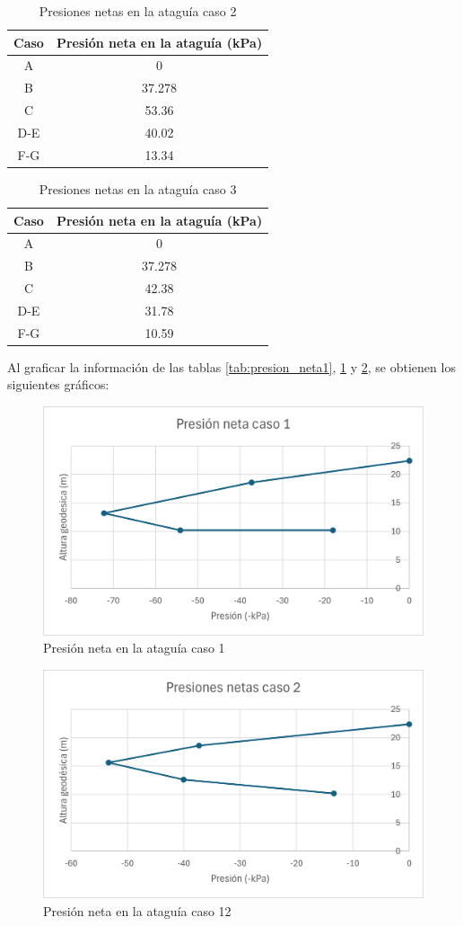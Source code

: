 \documentclass{article}
\begin{document}
\begin{table}[h!]
  \centering
  \begin{tabular}{cc}
    \hline
    \textbf{Caso} & \textbf{Presión neta en la ataguía (kPa)} \\
    \hline
    A & 0 \\
    B & 37.278 \\
    C & 53.36 \\
    D-E & 40.02\\
    F-G & 13.34 \\
    \hline  
  \end{tabular}
  \caption{Presiones netas en la ataguía caso 2}
  \label{tab:presion_neta2}
\end{table}

\begin{table}[h!]
  \centering
  \begin{tabular}{cc}
    \hline
    \textbf{Caso} & \textbf{Presión neta en la ataguía (kPa)} \\
    \hline
    A & 0 \\
    B & 37.278 \\
    C & 42.38 \\
    D-E & 31.78\\
    F-G & 10.59 \\
    \hline  
  \end{tabular}
  \caption{Presiones netas en la ataguía caso 3}
  \label{tab:presion_neta3}
\end{table}

Al graficar la información de las tablas \ref{tab:presion_neta1}, \ref{tab:presion_neta2} y \ref{tab:presion_neta3}, se obtienen los siguientes gráficos:


\begin{figure}[h!]
  \centering
  \includegraphics[width=0.55\linewidth]{graficos/grafico_presiones_1.png}
  \caption{Presión neta en la ataguía caso 1}
  \label{fig:presion_neta1}
\end{figure}

\newpage

\begin{figure}[h!]
  \centering
  \includegraphics[width=0.55\linewidth]{graficos/grafico_presiones_2.png}
  \caption{Presión neta en la ataguía caso 12}
  \label{fig:presion_neta2}
\end{figure}
\end{document}
